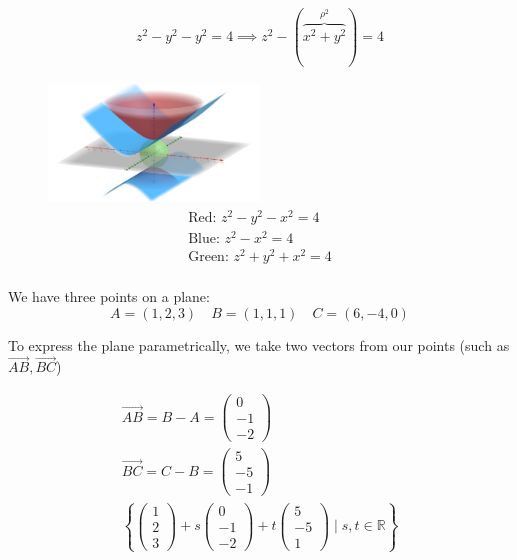\documentclass[00_complete]{subfiles}
\begin{document}
\begin{example}
$$
\begin{gathered}
    z^2-y^2-y^2=4 \implies z^2 - (\overbrace{x^2+y^2}^{\rho^2})=4
\end{gathered}
$$

\begin{figure}[ht]
    \centering
      \includegraphics[width=0.5\textwidth]{fig2}
$$
\begin{gathered}
    \text{Red: } z^2-y^2-x^2=4 \\
    \text{Blue: } z^2-x^2=4 \\
    \text{Green: } z^2+y^2+x^2=4 \\
\end{gathered}
$$
\end{figure}

We have three points on a plane:
$$A=(1,2,3) \quad B=(1,1,1) \quad C=(6,-4,0)$$

To express the plane parametrically, we take two vectors from our points (such
as $\vec{AB}, \vec{BC}$)

$$
\begin{gathered}
    \vec{AB} = B - A = \begin{pmatrix}
        0\\-1\\-2
    \end{pmatrix} \\
    \vec{BC}  =C - B = \begin{pmatrix}
        5\\-5\\-1
    \end{pmatrix} \\
    \left\{\begin{pmatrix}
        1\\2\\3
    \end{pmatrix} + s \begin{pmatrix}
        0\\-1\\-2
    \end{pmatrix} + t \begin{pmatrix}
        5\\-5\\1
    \end{pmatrix} \mid s,t \in \mathbb{R}\right\}
\end{gathered}
$$

\end{example}
\end{document}
